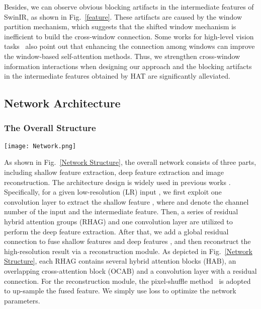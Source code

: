 \documentclass[10pt,twocolumn,letterpaper]{article}
\begin{document}
Besides, we can observe obvious blocking artifacts in the intermediate features of SwinIR, as shown in Fig.~\ref{feature}. These artifacts are caused by the window partition mechanism, which suggests that the shifted window mechanism is inefficient to build the cross-window connection.
Some works for high-level vision tasks~\cite{cswin,shufflet,palet,moa} also point out that enhancing the connection among windows can improve the window-based self-attention methods.
Thus, we strengthen cross-window information interactions when designing our approach and the blocking artifacts in the intermediate features obtained by HAT are significantly alleviated. 



\subsection{Network Architecture}

\subsubsection{The Overall Structure}

\begin{figure*}[!t]
\centering
\texttt{[image: Network.png]}
\vspace{-0.1cm}
\caption{The overall architecture of HAT and the structure of RHAG and HAB.}
\label{Network Structure}
\vspace{-0.5cm}
\end{figure*}


As shown in Fig.~\ref{Network Structure}, the overall network consists of three parts, including shallow feature extraction, deep feature extraction and image reconstruction. The architecture design is widely used in previous works \cite{rcan,swinir}. Specifically, for a given low-resolution (LR) input , we first exploit one convolution layer to extract the shallow feature , where  and  denote the channel number of the input and the intermediate feature. Then, a series of residual hybrid attention groups (RHAG) and one  convolution layer  are utilized to perform the deep feature extraction. After that, we add a global residual connection to fuse shallow features  and deep features , and then reconstruct the high-resolution result via a reconstruction module. As depicted in Fig.~\ref{Network Structure}, each RHAG contains several hybrid attention blocks (HAB), an overlapping cross-attention block (OCAB) and a  convolution layer with a residual connection. For the reconstruction module, the pixel-shuffle method~\cite{pixelshuffle} is adopted to up-sample the fused feature. We simply use  loss to optimize the network parameters.
\end{document}
